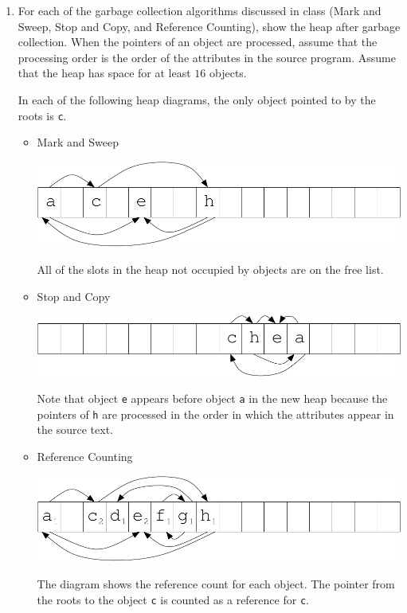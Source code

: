 \documentclass[11pt]{article}
\begin{document}
\begin{enumerate}
\begin{enumerate}
\item
For each of the garbage collection algorithms discussed in class (Mark
and Sweep, Stop and Copy, and Reference Counting), show the heap after
garbage collection.  When the pointers of an object are processed,
assume that the processing order is the order of the attributes in the
source program.  Assume that the heap has space for at least $16$
objects.

In each of the following heap diagrams, the only object pointed to by
the roots is \texttt{c}.

\begin{itemize}
\item
Mark and Sweep
\begin{center}
\includegraphics{marksweep}
\end{center}

All of the slots in the heap not occupied by objects are on the free
list.

\item
Stop and Copy
\begin{center}
\includegraphics{stopcopy}
\end{center}

Note that object \texttt{e} appears before object \texttt{a} in the
new heap because the pointers of \texttt{h} are processed in the order
in which the attributes appear in the source text.

\item
Reference Counting
\begin{center}
\includegraphics{refcount}
\end{center}

The diagram shows the reference count for each object.  The pointer
from the roots to the object \texttt{c} is counted as a reference for
\texttt{c}.
\end{itemize}
\end{enumerate}

\end{enumerate}
\end{document}
